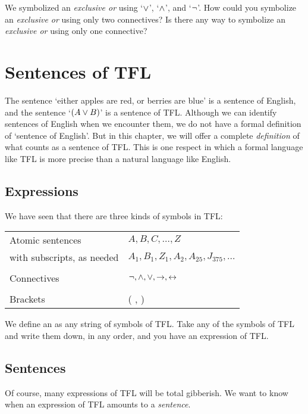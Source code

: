 \problempart
We symbolized an \emph{exclusive or} using `$\vee$', `$\wedge$', and `$\neg$'. How could you symbolize an \emph{exclusive or} using only two connectives? Is there any way to symbolize an \emph{exclusive or} using only one connective?


\chapter{Sentences of TFL}\label{s:TFLSentences}
The sentence `either apples are red, or berries are blue' is a sentence of English, and the sentence `$(A\vee B)$' is a sentence of TFL. Although we can identify sentences of English when we encounter them, we do not have a formal definition of `sentence of English'. But in this chapter, we will offer a complete \emph{definition} of what counts as a sentence of TFL. This is one respect in which a formal language like TFL is more precise than a natural language like English.


\section{Expressions}

We have seen that there are three kinds of symbols in TFL:
\begin{center}
\begin{tabular}{l l}
Atomic sentences & $A,B,C,\ldots,Z$\\
with subscripts, as needed & $A_1, B_1,Z_1,A_2,A_{25},J_{375},\ldots$\\
\\
Connectives & $\neg,\wedge,\vee,\rightarrow,\leftrightarrow$\\
\\
Brackets &( , )\\
\end{tabular}
\end{center}
We define an  as any string of symbols of TFL. Take any of the symbols of TFL and write them down, in any order, and you have an expression of TFL.


\section{Sentences}\label{s:Sentences}
Of course, many expressions of TFL will be total gibberish. We want to know when an expression of TFL amounts to a \emph{sentence}. 

